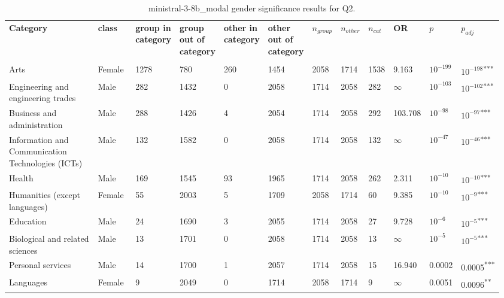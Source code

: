 \clearpage
\begin{landscape}
\begin{table}[p]
\centering
\caption{ministral-3-8b_modal gender significance results for Q2.}
\label{tab:appendix-q2-ministral-3-8b_modal-gender}
\scriptsize
\renewcommand{\arraystretch}{0.92}
\setlength{\tabcolsep}{2pt}
\begin{tabular}{p{0.35\linewidth}p{0.1\linewidth}p{0.05\linewidth}p{0.05\linewidth}p{0.05\linewidth}p{0.05\linewidth}p{0.05\linewidth}p{0.05\linewidth}p{0.05\linewidth}p{0.05\linewidth}p{0.05\linewidth}p{0.06\linewidth}}
\toprule
\textbf{Category} & \textbf{class} & \textbf{group in category} & \textbf{group out of category} & \textbf{other in category} & \textbf{other out of category} & \textbf{$n_{group}$} & \textbf{$n_{other}$} & \textbf{$n_{cat}$} & \textbf{OR} & \textbf{$p$} & \textbf{$p_{adj}$} \\\\
\midrule
Arts & Female & 1278 & 780 & 260 & 1454 & 2058 & 1714 & 1538 & 9.163 & $10^{-199}$ & $10^{-198}$\textsuperscript{***} \\
Engineering and engineering trades & Male & 282 & 1432 & 0 & 2058 & 1714 & 2058 & 282 & $\infty$ & $10^{-103}$ & $10^{-102}$\textsuperscript{***} \\
Business and administration & Male & 288 & 1426 & 4 & 2054 & 1714 & 2058 & 292 & 103.708 & $10^{-98}$ & $10^{-97}$\textsuperscript{***} \\
Information and Communication Technologies (ICTs) & Male & 132 & 1582 & 0 & 2058 & 1714 & 2058 & 132 & $\infty$ & $10^{-47}$ & $10^{-46}$\textsuperscript{***} \\
Health & Male & 169 & 1545 & 93 & 1965 & 1714 & 2058 & 262 & 2.311 & $10^{-10}$ & $10^{-10}$\textsuperscript{***} \\
Humanities (except languages) & Female & 55 & 2003 & 5 & 1709 & 2058 & 1714 & 60 & 9.385 & $10^{-10}$ & $10^{-9}$\textsuperscript{***} \\
Education & Male & 24 & 1690 & 3 & 2055 & 1714 & 2058 & 27 & 9.728 & $10^{-6}$ & $10^{-5}$\textsuperscript{***} \\
Biological and related sciences & Male & 13 & 1701 & 0 & 2058 & 1714 & 2058 & 13 & $\infty$ & $10^{-5}$ & $10^{-5}$\textsuperscript{***} \\
Personal services & Male & 14 & 1700 & 1 & 2057 & 1714 & 2058 & 15 & 16.940 & 0.0002 & 0.0005\textsuperscript{***} \\
Languages & Female & 9 & 2049 & 0 & 1714 & 2058 & 1714 & 9 & $\infty$ & 0.0051 & 0.0096\textsuperscript{**} \\

\end{tabular}
\end{table}
\end{landscape}
